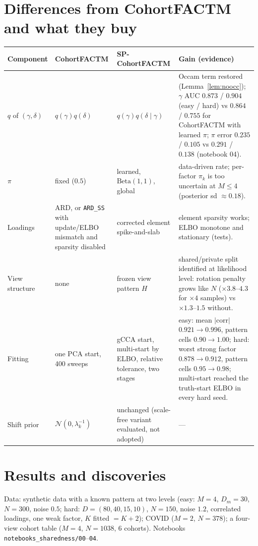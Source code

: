 \documentclass[11pt,a4paper]{article}
\newcommand{\new}[1]{{\color{red}#1}}
\newcommand{\N}{\mathcal{N}}
\newcommand{\Betad}{\mathrm{Beta}}
\newcommand{\RESCOHORT}{$\gamma$ AUC $0.873$ / $0.904$ (easy / hard) vs $0.864$ / $0.755$ for CohortFACTM with learned $\pi$; $\pi$ error $0.235$ / $0.105$ vs $0.291$ / $0.138$ (notebook 04).}
\newcommand{\RESFIT}{easy: mean $|$corr$|$ $0.921\to0.996$, pattern cells $0.90\to1.00$; hard: worst strong factor $0.878\to0.912$, pattern cells $0.95\to0.98$; multi-start reached the truth-start ELBO in every hard seed.}
\theoremstyle{definition}
\theoremstyle{remark}
\begin{document}
\section{Differences from CohortFACTM and what they buy}
\begin{longtable}{@{}p{2.5cm}p{3.6cm}p{4.1cm}p{4.9cm}@{}}\toprule
Component & CohortFACTM & SP-CohortFACTM & Gain (evidence)\\\midrule\endhead
$q$ of $(\gamma,\delta)$ & $q(\gamma)q(\delta)$ & \new{$q(\gamma)q(\delta\mid\gamma)$} & Occam term restored (Lemma~\ref{lem:noocc}); \RESCOHORT\\
$\pi$ & fixed ($0.5$) & \new{learned, $\Betad(1,1)$, global} & data-driven rate; per-factor $\pi_k$ is too uncertain at $M\le4$ (posterior sd $\approx0.18$).\\
Loadings & ARD, or \texttt{ARD\_SS} with update/ELBO mismatch and sparsity disabled & \new{corrected element spike-and-slab} & element sparsity works; ELBO monotone and stationary (tests).\\
View structure & none & \new{frozen view pattern $H$} & shared/private split identified at likelihood level: rotation penalty grows like $N$ ($\times3.8$--$4.3$ for $\times4$ samples) vs $\times1.3$--$1.5$ without.\\
Fitting & one PCA start, 400 sweeps & \new{gCCA start, multi-start by ELBO, relative tolerance, two stages} & \RESFIT\\
Shift prior & $\N(0,\lambda_k^{-1})$ & unchanged (scale-free variant evaluated, not adopted) & ---\\
\bottomrule
\end{longtable}

\section{Results and discoveries}\label{sec:results}
Data: synthetic data with a known pattern at two levels (easy: $M=4$, $D_m=30$, $N=300$, noise $0.5$; hard:
$D=(80,40,15,10)$, $N=150$, noise $1.2$, correlated loadings, one weak factor, $K$ fitted $=K+2$); COVID ($M=2$, $N=378$);
a four-view cohort table ($M=4$, $N=1038$, 6 cohorts). Notebooks \texttt{notebooks\_sharedness/00}--\texttt{04}.
\end{document}
